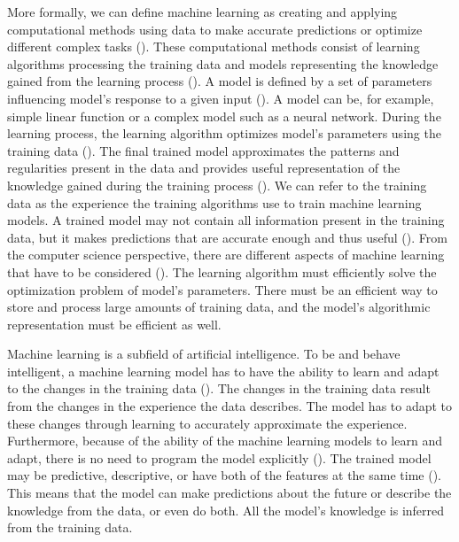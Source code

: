 \documentclass{BachelorBUI}
\begin{document}
        More formally, we can define machine learning as creating and applying computational methods using data to make accurate predictions or optimize different complex tasks (\cite{Mohri:2018}). These computational methods consist of learning algorithms processing the training data and models representing the knowledge gained from the learning process (\cite{Alpaydin:2014}). A model is defined by a set of parameters influencing model's response to a given input (\cite{Alpaydin:2014}). A model can be, for example, simple linear function or a complex model such as a neural network. During the learning process, the learning algorithm optimizes model's parameters using the training data (\cite{Alpaydin:2014}). The final trained model approximates the patterns and regularities present in the data and provides useful representation of the knowledge gained during the training process (\cite{Alpaydin:2014}). We can refer to the training data as the experience the training algorithms use to train machine learning models. A trained model may not contain all information present in the training data, but it makes predictions that are accurate enough and thus useful (\cite{Alpaydin:2014}). From the computer science perspective, there are different aspects of machine learning that have to be considered (\cite{Alpaydin:2014}). The learning algorithm must efficiently solve the optimization problem of model's parameters. There must be an efficient way to store and process large amounts of training data, and the model's algorithmic representation must be efficient as well.

        Machine learning is a subfield of artificial intelligence. To be and behave intelligent, a machine learning model has to have the ability to learn and adapt to the changes in the training data (\cite{Alpaydin:2014}). The changes in the training data result from the changes in the experience the data describes. The model has to adapt to these changes through learning to accurately approximate the experience. Furthermore, because of the ability of the machine learning models to learn and adapt, there is no need to program the model explicitly (\cite{Alpaydin:2014}). The trained model may be predictive, descriptive, or have both of the features at the same time (\cite{Alpaydin:2014}). This means that the model can make predictions about the future or describe the knowledge from the data, or even do both. All the model's knowledge is inferred from the training data.
\end{document}
